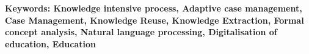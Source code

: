 \begin{footnotesize}

\medskip

\textbf{Keywords:
Knowledge intensive process,
Adaptive case management,
Case Management,
Knowledge Reuse,
Knowledge Extraction,
Formal concept analysis,
Natural language processing,
Digitalisation of education,
Education}

\shorthandon{:} %

\vfill
\hspace{0pt}

\end{footnotesize}

